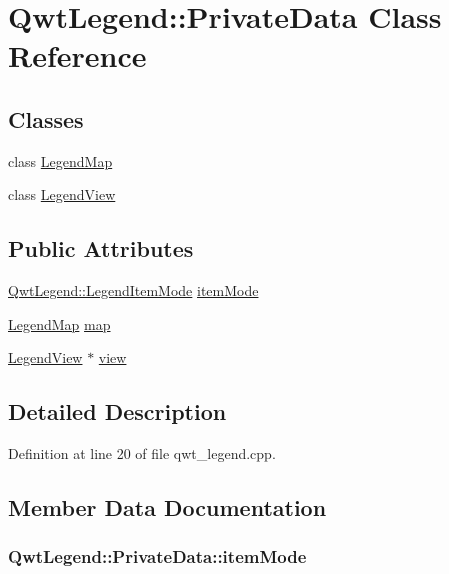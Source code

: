 \hypertarget{class_qwt_legend_1_1_private_data}{\section{Qwt\-Legend\-:\-:Private\-Data Class Reference}
\label{class_qwt_legend_1_1_private_data}
}
\subsection*{Classes}
\begin{DoxyCompactItemize}
\item 
class \hyperlink{class_qwt_legend_1_1_private_data_1_1_legend_map}{Legend\-Map}
\item 
class \hyperlink{class_qwt_legend_1_1_private_data_1_1_legend_view}{Legend\-View}
\end{DoxyCompactItemize}
\subsection*{Public Attributes}
\begin{DoxyCompactItemize}
\item 
\hyperlink{class_qwt_legend_ab216dd2dba9ebf6cb0ed2dd621a652e0}{Qwt\-Legend\-::\-Legend\-Item\-Mode} \hyperlink{class_qwt_legend_1_1_private_data_a6bb3702a3c60597a5c91bfc7821371e4}{item\-Mode}
\item 
\hyperlink{class_qwt_legend_1_1_private_data_1_1_legend_map}{Legend\-Map} \hyperlink{class_qwt_legend_1_1_private_data_a921ea2a8e215eb723bb218ae2d199d15}{map}
\item 
\hyperlink{class_qwt_legend_1_1_private_data_1_1_legend_view}{Legend\-View} $\ast$ \hyperlink{class_qwt_legend_1_1_private_data_ad63e70c48d0b352cf1d06ace388e253f}{view}
\end{DoxyCompactItemize}


\subsection{Detailed Description}


Definition at line 20 of file qwt\-\_\-legend.\-cpp.



\subsection{Member Data Documentation}
\hypertarget{class_qwt_legend_1_1_private_data_a6bb3702a3c60597a5c91bfc7821371e4}{
\subsubsection[{item\-Mode}]{ Qwt\-Legend\-::\-Private\-Data\-::item\-Mode}}\label{class_qwt_legend_1_1_private_data_a6bb3702a3c60597a5c91bfc7821371e4}


